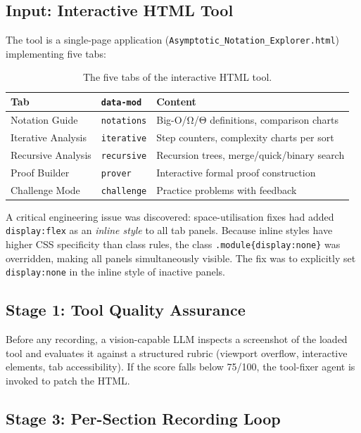 \documentclass[12pt,a4paper]{article}
\begin{document}
\subsection{Input: Interactive HTML Tool}

The tool is a single-page application
(\texttt{Asymptotic\_Notation\_Explorer.html}) implementing five tabs:

\begin{table}[h]
\centering\small
\begin{tabular}{@{}lll@{}}
\toprule
\textbf{Tab} & \textbf{\texttt{data-mod}} & \textbf{Content} \\
\midrule
Notation Guide     & \texttt{notations}  & Big-O/Ω/Θ definitions, comparison charts \\
Iterative Analysis & \texttt{iterative}  & Step counters, complexity charts per sort \\
Recursive Analysis & \texttt{recursive}  & Recursion trees, merge/quick/binary search \\
Proof Builder      & \texttt{prover}     & Interactive formal proof construction \\
Challenge Mode     & \texttt{challenge}  & Practice problems with feedback \\
\bottomrule
\end{tabular}
\caption{The five tabs of the interactive HTML tool.}
\end{table}

A critical engineering issue was discovered: space-utilisation fixes had added
\texttt{display:flex} as an \emph{inline style} to all tab panels. Because
inline styles have higher CSS specificity than class rules, the class
\texttt{.module\{display:none\}} was overridden, making all panels simultaneously
visible. The fix was to explicitly set \texttt{display:none} in the inline style
of inactive panels.

\subsection{Stage 1: Tool Quality Assurance}

Before any recording, a vision-capable LLM inspects a screenshot of the loaded
tool and evaluates it against a structured rubric (viewport overflow, interactive
elements, tab accessibility). If the score falls below 75/100, the tool-fixer
agent is invoked to patch the HTML.

\subsection{Stage 3: Per-Section Recording Loop}
\label{sec:recording}
\end{document}
